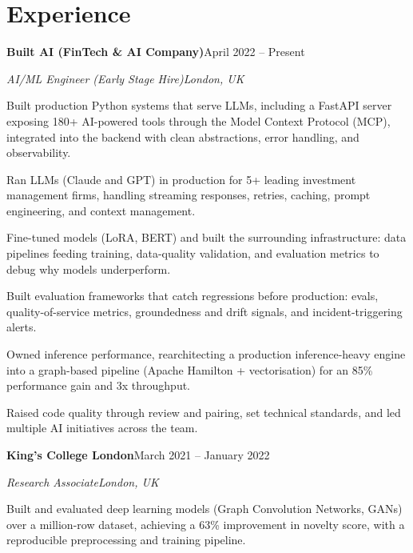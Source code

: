 \documentclass[10pt,a4paper]{article}
\newcommand{\entry}[4]{%
  {\color{company}\bfseries #1}\hfill {\color{muted}#2}\par
  \vspace{1pt}
  {\itshape #3}\hfill {\color{muted}\itshape #4}\par
  \vspace{3pt}%
}
\begin{document}
\section{Experience}
\entry{Built AI (FinTech \& AI Company)}{April 2022 -- Present}{AI/ML Engineer (Early Stage Hire)}{London, UK}
\begin{tight}
  \item Built production Python systems that serve LLMs, including a FastAPI server exposing 180+ AI-powered tools through the Model Context Protocol (MCP), integrated into the backend with clean abstractions, error handling, and observability.
  \item Ran LLMs (Claude and GPT) in production for 5+ leading investment management firms, handling streaming responses, retries, caching, prompt engineering, and context management.
  \item Fine-tuned models (LoRA, BERT) and built the surrounding infrastructure: data pipelines feeding training, data-quality validation, and evaluation metrics to debug why models underperform.
  \item Built evaluation frameworks that catch regressions before production: evals, quality-of-service metrics, groundedness and drift signals, and incident-triggering alerts.
  \item Owned inference performance, rearchitecting a production inference-heavy engine into a graph-based pipeline (Apache Hamilton + vectorisation) for an 85\% performance gain and 3x throughput.
  \item Raised code quality through review and pairing, set technical standards, and led multiple AI initiatives across the team.
\end{tight}

\entry{King's College London}{March 2021 -- January 2022}{Research Associate}{London, UK}
\begin{tight}
  \item Built and evaluated deep learning models (Graph Convolution Networks, GANs) over a million-row dataset, achieving a 63\% improvement in novelty score, with a reproducible preprocessing and training pipeline.
\end{tight}

\end{document}
